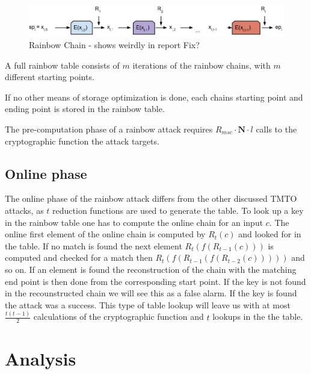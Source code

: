 \begin{figure}[H]
  \centering
  \includegraphics[scale=0.4]{figures/rainbowchain.png}
  \caption{Rainbow Chain - shows weirdly in report Fix?}
  \label{fig:rainbowchain}
\end{figure}

A full rainbow table consists of $m$ iterations of the rainbow chains,
with $m$ different starting points.

If no other means of storage optimization is done, each chains
starting point and ending point is stored in the rainbow table.

The pre-computation phase of a rainbow attack requires 
$R_{msc} \cdot \textbf{N} \cdot l$ calls to the cryptographic function the attack targets. 

\subsection{Online phase}

The online phase of the rainbow attack differs from the other
discussed TMTO attacks, as $t$ reduction functions are used to
generate the table. To look up a key in the rainbow table one has to
compute the online chain for an input $c$. The online first element of
the online chain is computed by $R_t(c)$ and looked for in the
table. If no match is found the next element $R_t(f(R_{t-1}(c)))$ is
computed and checked for a match then $R_t(f(R_{t-1}(f(R_{t-2}(c)))))$
and so on. If an element is found the reconstruction of the chain with
the matching end point is then done from the corresponding start
point. If the key is not found in the recounstructed chain we will see
this as a false alarm. If the key is found the attack was a
success. This type of table lookup will leave us with at most
$\frac{t(t - 1)}{2}$ calculations of the cryptographic function and
$t$ lookups in the the table.

\section{Analysis}





